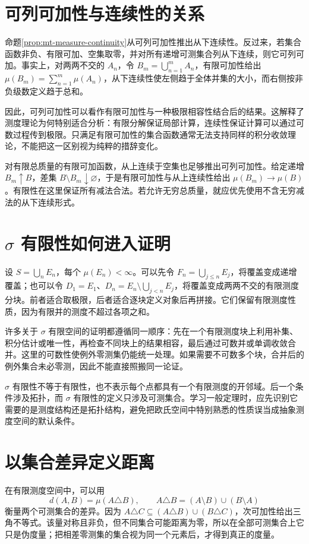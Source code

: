 \section{可列可加性与连续性的关系}
命题\ref{prop:mt-measure-continuity}从可列可加性推出从下连续性。反过来，若集合函数非负、有限可加、空集取零，并对所有递增可测集合列从下连续，则它可列可加。事实上，对两两不交的 $A_n$，令 $B_m=\bigcup_{n=1}^{m}A_n$，有限可加性给出 $\mu(B_m)=\sum_{n=1}^{m}\mu(A_n)$，从下连续性使左侧趋于全体并集的大小，而右侧按非负级数定义趋于总和。

因此，可列可加性可以看作有限可加性与一种极限相容性结合后的结果。这解释了测度理论为何特别适合分析：有限分解保证局部计算，连续性保证计算可以通过可数过程传到极限。只满足有限可加性的集合函数通常无法支持同样的积分收敛理论，不能把这一区别视为纯粹的措辞变化。

对有限总质量的有限可加函数，从上连续于空集也足够推出可列可加性。给定递增 $B_m\uparrow B$，差集 $B\setminus B_m\downarrow\varnothing$，于是有限可加性与从上连续性给出 $\mu(B_m)\to\mu(B)$。有限性在这里保证所有减法合法。若允许无穷总质量，就应优先使用不含无穷减法的从下连续形式。

\section{$\sigma$ 有限性如何进入证明}
设 $S=\bigcup_nE_n$，每个 $\mu(E_n)<\infty$。可以先令 $F_n=\bigcup_{j\leq n}E_j$，将覆盖变成递增覆盖；也可以令 $D_1=E_1$、$D_n=E_n\setminus\bigcup_{j<n}E_j$，将覆盖变成两两不交的有限测度分块。前者适合取极限，后者适合逐块定义对象后再拼接。它们保留有限测度性质，因为有限并的测度不超过各项之和。

许多关于 $\sigma$ 有限空间的证明都遵循同一顺序：先在一个有限测度块上利用补集、积分估计或唯一性，再检查不同块上的结果相容，最后通过可数并或单调收敛合并。这里的可数性使例外零测集仍能统一处理。如果需要不可数多个块，合并后的例外集合未必零测，因此不能直接照搬同一论证。

$\sigma$ 有限性不等于有限性，也不表示每个点都具有一个有限测度的开邻域。后一个条件涉及拓扑，而 $\sigma$ 有限性的定义只涉及可测集合。学习一般定理时，应先识别它需要的是测度结构还是拓扑结构，避免把欧氏空间中特别熟悉的性质误当成抽象测度空间的默认条件。

\section{以集合差异定义距离}
在有限测度空间中，可以用
\[
 d(A,B)=\mu(A\triangle B),\qquad
 A\triangle B=(A\setminus B)\cup(B\setminus A)
\]
衡量两个可测集合的差异。因为 $A\triangle C\subseteq(A\triangle B)\cup(B\triangle C)$，次可加性给出三角不等式。该量对称且非负，但不同集合可能距离为零，所以在全部可测集合上它只是伪度量；把相差零测集的集合视为同一个元素后，才得到真正的度量。

